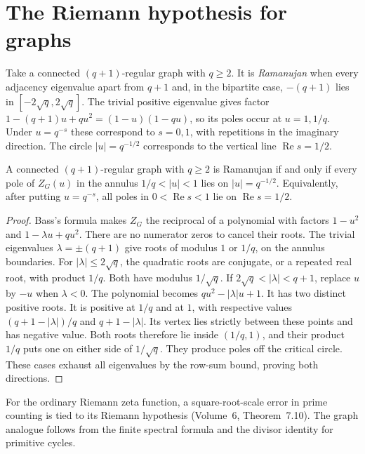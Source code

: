 \section{The Riemann hypothesis for graphs}

Take a connected $(q+1)$-regular graph with $q\ge2$. It is \emph{Ramanujan} when every adjacency eigenvalue apart from $q+1$ and, in the bipartite case, $-(q+1)$ lies in $[-2\sqrt q,2\sqrt q]$. The trivial positive eigenvalue gives factor
$1-(q+1)u+qu^2=(1-u)(1-qu)$,
so its poles occur at $u=1,1/q$. Under $u=q^{-s}$ these correspond to $s=0,1$, with repetitions in the imaginary direction. The circle $|u|=q^{-1/2}$ corresponds to the vertical line $\operatorname{Re}s=1/2$.


\begin{theorem}[Sunada, 1986]\label{thm:graphRH}
A connected $(q+1)$-regular graph with $q\ge2$ is Ramanujan if and only if every pole of $Z_G(u)$ in the annulus $1/q<|u|<1$ lies on $|u|=q^{-1/2}$. Equivalently, after putting $u=q^{-s}$, all poles in $0<\operatorname{Re}s<1$ lie on $\operatorname{Re}s=1/2$.
\end{theorem}
\begin{proof}
Bass's formula makes $Z_G$ the reciprocal of a polynomial with factors $1-u^2$ and $1-\lambda u+qu^2$. There are no numerator zeros to cancel their roots. The trivial eigenvalues $\lambda=\pm(q+1)$ give roots of modulus $1$ or $1/q$, on the annulus boundaries.
For $|\lambda|\le2\sqrt q$, the quadratic roots are conjugate, or a repeated real root, with product $1/q$. Both have modulus $1/\sqrt q$.
If $2\sqrt q<|\lambda|<q+1$, replace $u$ by $-u$ when $\lambda<0$. The polynomial becomes $qu^2-|\lambda|u+1$. It has two distinct positive roots. It is positive at $1/q$ and at $1$, with respective values $(q+1-|\lambda|)/q$ and $q+1-|\lambda|$. Its vertex lies strictly between these points and has negative value. Both roots therefore lie inside $(1/q,1)$, and their product $1/q$ puts one on either side of $1/\sqrt q$. They produce poles off the critical circle. These cases exhaust all eigenvalues by the row-sum bound, proving both directions.
\end{proof}

For the ordinary Riemann zeta function, a square-root-scale error in prime counting is tied to its Riemann hypothesis (Volume~6, Theorem~7.10). The graph analogue follows from the finite spectral formula and the divisor identity for primitive cycles.

